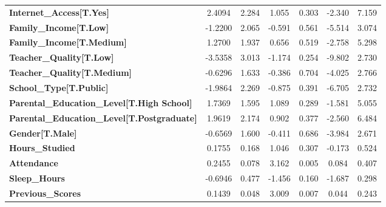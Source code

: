 \documentclass[11pt]{article}
\begin{document}
\begin{center}
\begin{tabular}{lcccccc}
\textbf{Internet\_Access[T.Yes]}                    &       2.4094  &        2.284     &     1.055  &         0.303        &       -2.340    &        7.159     \\
\textbf{Family\_Income[T.Low]}                      &      -1.2200  &        2.065     &    -0.591  &         0.561        &       -5.514    &        3.074     \\
\textbf{Family\_Income[T.Medium]}                   &       1.2700  &        1.937     &     0.656  &         0.519        &       -2.758    &        5.298     \\
\textbf{Teacher\_Quality[T.Low]}                    &      -3.5358  &        3.013     &    -1.174  &         0.254        &       -9.802    &        2.730     \\
\textbf{Teacher\_Quality[T.Medium]}                 &      -0.6296  &        1.633     &    -0.386  &         0.704        &       -4.025    &        2.766     \\
\textbf{School\_Type[T.Public]}                     &      -1.9864  &        2.269     &    -0.875  &         0.391        &       -6.705    &        2.732     \\
\textbf{Parental\_Education\_Level[T.High School]}  &       1.7369  &        1.595     &     1.089  &         0.289        &       -1.581    &        5.055     \\
\textbf{Parental\_Education\_Level[T.Postgraduate]} &       1.9619  &        2.174     &     0.902  &         0.377        &       -2.560    &        6.484     \\
\textbf{Gender[T.Male]}                             &      -0.6569  &        1.600     &    -0.411  &         0.686        &       -3.984    &        2.671     \\
\textbf{Hours\_Studied}                             &       0.1755  &        0.168     &     1.046  &         0.307        &       -0.173    &        0.524     \\
\textbf{Attendance}                                 &       0.2455  &        0.078     &     3.162  &         0.005        &        0.084    &        0.407     \\
\textbf{Sleep\_Hours}                               &      -0.6946  &        0.477     &    -1.456  &         0.160        &       -1.687    &        0.298     \\
\textbf{Previous\_Scores}                           &       0.1439  &        0.048     &     3.009  &         0.007        &        0.044    &        0.243     \\

\end{tabular}
\end{center}
\end{document}
